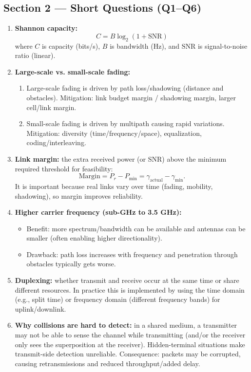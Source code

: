 \documentclass[11pt,a4paper]{article}
\begin{document}
\subsection*{Section 2 --- Short Questions (Q1--Q6)}
\begin{enumerate}[label=\arabic*.]
    \item \textbf{Shannon capacity:} \[
    C = B\log_2(1+\mathrm{SNR})
    \]
    where $C$ is capacity (bits/s), $B$ is bandwidth (Hz), and $\mathrm{SNR}$ is signal-to-noise ratio (linear).

    \item \textbf{Large-scale vs. small-scale fading:}
    \begin{enumerate}[label=\alph*.]
        \item Large-scale fading is driven by path loss/shadowing (distance and obstacles). Mitigation: link budget margin / shadowing margin, larger cell/link margin.
        \item Small-scale fading is driven by multipath causing rapid variations. Mitigation: diversity (time/frequency/space), equalization, coding/interleaving.
    \end{enumerate}

    \item \textbf{Link margin:} the extra received power (or SNR) above the minimum required threshold for feasibility:
    \[
    \text{Margin} = P_r - P_{\min} = \gamma_\text{actual} - \gamma_{\min}.
    \]
    It is important because real links vary over time (fading, mobility, shadowing), so margin improves reliability.

    \item \textbf{Higher carrier frequency (sub-GHz to 3.5 GHz):}
    \begin{itemize}
        \item Benefit: more spectrum/bandwidth can be available and antennas can be smaller (often enabling higher directionality).
        \item Drawback: path loss increases with frequency and penetration through obstacles typically gets worse.
    \end{itemize}

    \item \textbf{Duplexing:} whether transmit and receive occur at the same time or share different resources. In practice this is implemented by using the time domain (e.g., split time) or frequency domain (different frequency bands) for uplink/downlink.

    \item \textbf{Why collisions are hard to detect:} in a shared medium, a transmitter may not be able to sense the channel while transmitting (and/or the receiver only sees the superposition at the receiver). Hidden-terminal situations make transmit-side detection unreliable. Consequence: packets may be corrupted, causing retransmissions and reduced throughput/added delay.
\end{enumerate}
\end{document}
